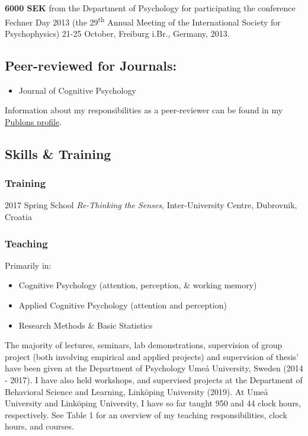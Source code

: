 \documentclass[]{article}
\providecommand{\tightlist}{%
  \setlength{\itemsep}{0pt}\setlength{\parskip}{0pt}}
\begin{document}
\textbf{6000 SEK} from the Department of Psychology for participating
the conference Fechner Day 2013 (the 29\textsuperscript{th} Annual
Meeting of the International Society for Psychophysics) 21-25 October,
Freiburg i.Br., Germany, 2013.

\hypertarget{peer-reviewed-for-journals}{%
\subsection{Peer-reviewed for
Journals:}\label{peer-reviewed-for-journals}}

\begin{itemize}
\tightlist
\item
  Journal of Cognitive Psychology
\end{itemize}

Information about my responsibilities as a peer-reviewer can be found in
my \href{https://www.publons.com/a/1517052/}{Publons profile}.

\hypertarget{skills-training}{%
\subsection{Skills \& Training}\label{skills-training}}

\hypertarget{training}{%
\subsubsection{Training}\label{training}}

2017 Spring School \emph{Re-Thinking the Senses}, Inter-University
Centre, Dubrovnik, Croatia

\hypertarget{teaching}{%
\subsubsection{Teaching}\label{teaching}}

Primarily in:

\begin{itemize}
\tightlist
\item
  Cognitive Psychology (attention, perception, \& working memory)
\item
  Applied Cognitive Psychology (attention and perception)
\item
  Research Methods \& Basic Statistics
\end{itemize}

The majority of lectures, seminars, lab demonstrations, supervision of
group project (both involving empirical and applied projects) and
supervision of thesis' have been given at the Department of Psychology
Umeå University, Sweden (2014 - 2017). I have also held workshops, and
supervised projects at the Department of Behavioral Science and
Learning, Linköping University (2019). At Umeå University and Linköping
University, I have so far taught 950 and 44 clock hours, respectively.
See Table 1 for an overview of my teaching responsibilities, clock
hours, and courses.
\end{document}
